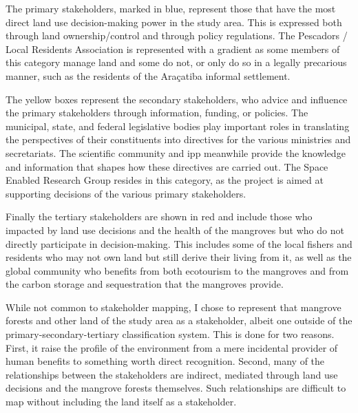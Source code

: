 The primary stakeholders, marked in blue, represent those that have the most direct land use decision-making power in the study area. This is expressed both through land ownership/control and through policy regulations. The Pescadors / Local Residents Association is represented with a gradient as some members of this category manage land and some do not, or only do so in a legally precarious manner, such as the residents of the Araçatiba informal settlement. 

The yellow boxes represent the secondary stakeholders, who advice and influence the primary stakeholders through information, funding, or policies. The municipal, state, and federal legislative bodies play important roles in translating the perspectives of their constituents into directives for the various ministries and secretariats. The scientific community and \ac{ipp} meanwhile provide the knowledge and information that shapes how these directives are carried out. The Space Enabled Research Group resides in this category, as the project is aimed at supporting decisions of the various primary stakeholders. 

Finally the tertiary stakeholders are shown in red and include those who impacted by land use decisions and the health of the mangroves but who do not directly participate in decision-making. This includes some of the local fishers and residents who may not own land but still derive their living from it, as well as the global community who benefits from both ecotourism to the mangroves and from the carbon storage and sequestration that the mangroves provide.

While not common to stakeholder mapping, I chose to represent that mangrove forests and other land of the study area as a stakeholder, albeit one outside of the primary-secondary-tertiary classification system. This is done for two reasons. First, it raise the profile of the environment from a mere incidental provider of human benefits to something worth direct recognition. Second, many of the relationships between the stakeholders are indirect, mediated through land use decisions and the mangrove forests themselves. Such relationships are difficult to map without including the land itself as a stakeholder.

